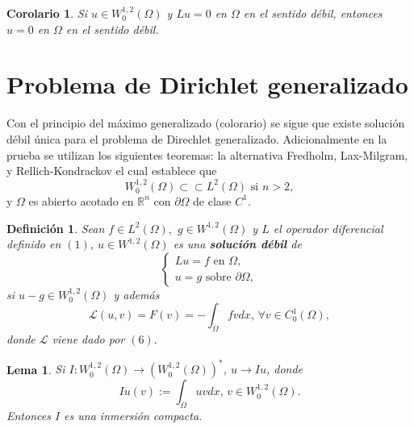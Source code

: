 \documentclass{article}
\newtheorem{corollary}[theorem]{Corolario}
\newtheorem{definition}[theorem]{Definici\'{o}n}
\newtheorem{lemma}[theorem]{Lema}
\begin{document}
\begin{corollary}
Si $u\in W_{0}^{1,2}\left( \Omega \right) $ y $Lu=0$ en $\Omega $ en el
sentido d\'{e}bil, entonces $u=0$ en $\Omega $ en el sentido d\'{e}bil.
\end{corollary}

\section{ Problema de Dirichlet generalizado}

Con el principio del m\'{a}ximo generalizado (colorario) se sigue que existe
soluci\'{o}n d\'{e}bil \'{u}nica para el problema de Direchlet 
generalizado. Adicionalmente en la prueba se utilizan los siguientes
teoremas: la alternativa Fredholm, Lax-Milgram, y Rellich-Kondrackov el cual
establece que 
\begin{equation*}
W_{0}^{1,2}\left( \Omega \right) \subset \subset L^{2}\left( \Omega \right) 
\text{ \ si }n>2,
\end{equation*}
y $\Omega $ es abierto acotado en $\mathbb{R}^{n}$ con $\partial \Omega $ de
clase $C^{1}$.

\begin{definition}
Sean $f\in L^{2}\left( \Omega \right) ,$ $g\in W^{1,2}\left( \Omega \right) $
y $L$ el operador diferencial definido en $\left( 1\right) $, $u\in
W^{1,2}\left( \Omega \right) $ es una \textbf{soluci\'{o}n d\'{e}bil} de 
\begin{equation*}
\left\{ 
\begin{array}{c}
Lu=f\text{ \ en }\Omega , \\ 
u=g\text{ sobre }\partial \Omega ,
\end{array}
\right. 
\end{equation*}
si $u-g\in W_{0}^{1,2}\left( \Omega \right) $ y adem\'{a}s 
\begin{equation}
\mathcal{L}\left( u,v\right) =F\left( v\right) =-\int_{\Omega }fvdx\text{, }%
\forall v\in C_{0}^{1}\left( \Omega \right) ,  \tag{8}
\end{equation}
donde $\mathcal{L}$ viene dado por $\left( 6\right) .$
\end{definition}

\begin{lemma}
Si $I:W_{0}^{1,2}\left( \Omega \right) \longrightarrow \left(
W_{0}^{1,2}\left( \Omega \right) \right) ^{\ast }$, $u\longrightarrow Iu$,
donde 
\begin{equation*}
Iu\left( v\right) :=\int_{\Omega }uvdx\text{, }v\in W_{0}^{1,2}\left( \Omega
\right) .
\end{equation*}
Entonces $I$ es una inmersi\'{o}n compacta.
\end{lemma}
\end{document}
